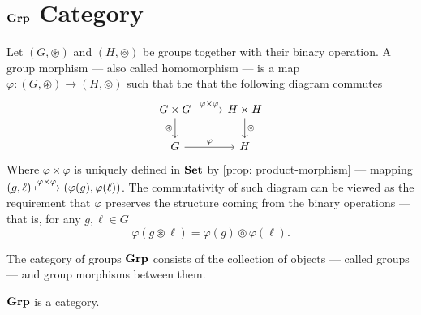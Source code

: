 \section{\texorpdfstring{\({\textbf{Grp}}\)}{Grp} Category}

\begin{definition}\label{def: grp-morphism}
Let \((G, \circledast)\) and \((H, \circledcirc)\) be groups together with
their binary operation. A group morphism --- also called homomorphism --- is a
map \(\varphi: (G, \circledast) \to (H, \circledcirc)\) such that the that the
following diagram commutes
\[
  \begin{tikzcd}
    G \times G \ar[d, swap, "\circledast"] \ar[r, "\varphi \times \varphi"]
    &H \times H \ar[d, "\circledcirc"] \\
    G \ar[r, "\varphi"] &H
  \end{tikzcd}
\]
Where \(\varphi \times \varphi\) is uniquely defined in \({\textbf{Set}}\) by
\cref{prop: product-morphism} --- mapping \((g, \ell) \xmapsto{\varphi \times
\varphi} (\varphi(g), \varphi(\ell))\). The commutativity of such diagram can
be viewed as the requirement that \(\varphi\) preserves the structure coming
from the binary operations --- that is, for any \(g, \ell \in G\)
\[
  \varphi(g \circledast \ell) = \varphi(g) \circledcirc \varphi(\ell).
\]
\end{definition}

\begin{definition}\label{def: grp}
The category of groups \({\textbf{Grp}}\) consists of the collection of objects ---
called groups --- and group morphisms between them.
\end{definition}

\begin{proposition}
\({\textbf{Grp}}\) is a category.
\end{proposition}

